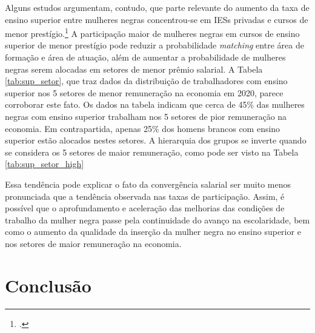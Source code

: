 \documentclass[12pt]{article}
\begin{document}
\par Alguns estudos argumentam, contudo, que parte relevante do aumento da taxa de ensino superior entre mulheres negras concentrou-se em IESs privadas e cursos de menor prestígio.\footcite[Cap. 1]{marcondes2013dossie} A participação maior de mulheres negras em cursos de ensino superior de menor prestígio pode reduzir a probabilidade \textit{matching} entre área de formação e área de atuação, além de aumentar a probabilidade de mulheres negras serem alocadas em setores de menor prêmio salarial. A Tabela \ref{tab:sup_setor}, que traz dados da distribuição de trabalhadores com ensino superior nos 5 setores de menor remuneração na economia em 2020, parece corroborar este fato. Os dados na tabela indicam que cerca de 45\% das mulheres negras com ensino superior trabalham nos 5 setores de pior remuneração na economia. Em contrapartida, apenas 25\% dos homens brancos com ensino superior estão alocados nestes setores. A hierarquia dos grupos se inverte quando se considera os 5 setores de maior remuneração, como pode ser visto na Tabela \ref{tab:sup_setor_high}








\par Essa tendência pode explicar o fato da convergência salarial ser muito menos pronunciada que a tendência observada nas taxas de participação. Assim, é possível que o aprofundamento e aceleração das melhorias das condições de trabalho da mulher negra passe pela continuidade do avanço na escolaridade, bem como o aumento da qualidade da inserção da mulher negra no ensino superior e nos setores de maior remuneração na economia.

\section{Conclusão}
\end{document}
